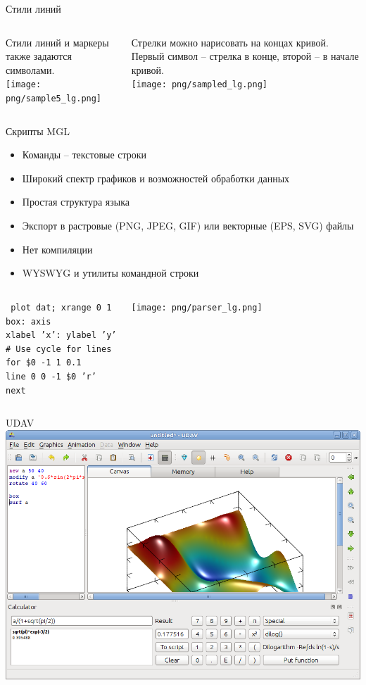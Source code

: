 \documentclass[color=usenames]{beamer}
\begin{document}
\begin{frame}{Стили линий}
\begin{columns}
Стили линий и маркеры также задаются символами.\\
\texttt{[image: png/sample5\_lg.png]}

Стрелки можно нарисовать на концах кривой. Первый символ -- стрелка в конце, второй -- в начале кривой.\\
\texttt{[image: png/sampled\_lg.png]}
\end{columns}
\end{frame}

\begin{frame}{Скрипты MGL}
\begin{itemize}
\item Команды -- текстовые строки
\item Широкий спектр графиков и возможностей обработки данных
\item Простая структура языка
\item Экспорт в растровые (PNG, JPEG, GIF) или векторные (EPS, SVG) файлы
\item Нет компиляции
\item WYSWYG и утилиты командной строки
\end{itemize}

\begin{columns}\small
{}
\texttt{\flushleft
plot dat; xrange 0 1\\
box: axis\\
xlabel 'x': ylabel 'y'\\
\# Use cycle for lines\\
for \$0 -1 1 0.1\\
line 0 0 -1 \$0 'r'\\
next}

\texttt{[image: png/parser\_lg.png]}
\end{columns}
\end{frame}

\begin{frame}{UDAV}
\includegraphics[width = \textwidth]{main.png}
\end{frame}
\end{document}
